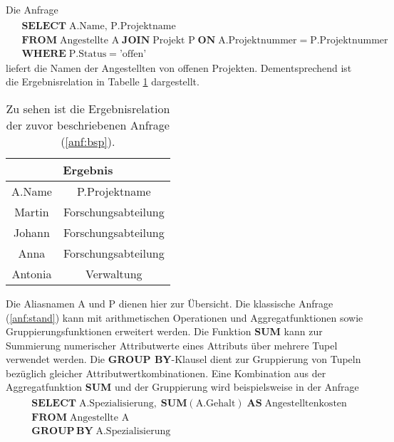 Die Anfrage 
\begin{align}
    \label{anf:bsp}
    \begin{split}
    & \mathbf{SELECT} \; \text{A.Name, P.Projektname}\\
    & \mathbf{FROM} \; \text{Angestellte A} \; \mathbf{JOIN} \; \text{Projekt P} \; \mathbf{ON} \; \text{A.Projektnummer} = \text{P.Projektnummer}\\
    &\mathbf{WHERE} \; \text{P.Status}=\text{'offen'}
\end{split}
\end{align}
liefert die Namen der Angestellten von offenen Projekten. Dementsprechend ist die Ergebnisrelation in Tabelle \ref{abb:result_relation} dargestellt.
\begin{table}[H]
    \centering
\begin{tabular}{|c|c|} \hline
    \multicolumn{2}{|c|}{\textbf{Ergebnis}} \\ \hline
    \hline
    A.Name & P.Projektname \\ 
    \hline
    Martin &Forschungsabteilung \\ 
    \hline
    Johann &Forschungsabteilung\\
    \hline
    Anna &Forschungsabteilung\\ 
    \hline
    Antonia &Verwaltung \\
    \hline
\end{tabular}
\caption[Ergebnisrelation einer SQL-Anfrage ]{Zu sehen ist die Ergebnisrelation der zuvor beschriebenen Anfrage (\ref{anf:bsp}).}
\label{abb:result_relation}
\end{table}
Die Aliasnamen \glqq A\grqq{} und \glqq P\grqq{} dienen hier zur Übersicht. Die klassische Anfrage (\ref{anf:stand}) kann mit arithmetischen Operationen und Aggregatfunktionen sowie Gruppierungsfunktionen erweitert werden. Die Funktion \textbf{SUM} kann zur Summierung numerischer Attributwerte eines Attributs über mehrere Tupel verwendet werden. Die \textbf{GROUP BY}-Klausel dient zur Gruppierung von Tupeln bezüglich gleicher Attributwertkombinationen. Eine Kombination aus der Aggregatfunktion \textbf{SUM} und der Gruppierung wird beispielsweise in der Anfrage
\begin{align}
    \label{anf:erw}
    \begin{split}
        & \mathbf{SELECT} \; \text{A.Spezialisierung}, \; \mathbf{SUM}(\text{A.Gehalt}) \; \mathbf{AS} \; \text{Angestelltenkosten}\\
        & \mathbf{FROM} \; \text{Angestellte A} \\
        &\mathbf{GROUP} \, \mathbf{BY} \; \text{A.Spezialisierung}
    \end{split}
\end{align}
